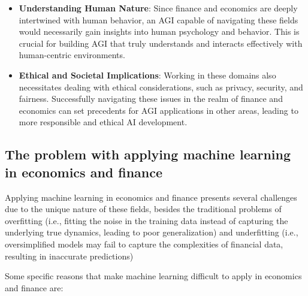 \documentclass[11pt, reqno]{amsart}
\theoremstyle{definition}
\theoremstyle{remark}
\begin{document}
\begin{itemize}
		\item \textbf{Understanding Human Nature}: Since finance and economics are
			deeply intertwined with human behavior, an AGI capable of navigating
			these fields would necessarily gain insights into human psychology
			and behavior. This is crucial for building AGI that truly understands
			and interacts effectively with human-centric environments.

		\item \textbf{Ethical and Societal Implications}: Working in these domains
			also necessitates dealing with ethical considerations, such as
			privacy, security, and fairness. Successfully navigating these issues
			in the realm of finance and economics can set precedents for AGI applications
			in other areas, leading to more responsible and ethical AI
			development.
	\end{itemize}

	\subsection{The problem with applying machine learning in economics and
	finance}

	Applying machine learning in economics and finance presents several
	challenges due to the unique nature of these fields, besides the traditional
	problems of overfitting (i.e., fitting the noise in the training data
	instead of capturing the underlying true dynamics, leading to poor generalization)
	and underfitting (i.e., oversimplified models may fail to capture the complexities
	of financial data, resulting in inaccurate predictions)

	Some specific reasons that make machine learning difficult to apply in
	economics and finance are:
\end{document}
